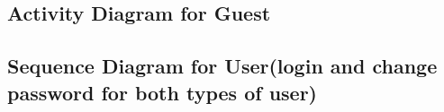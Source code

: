 \subsection{Activity Diagram for Guest}
\begin{figure}[H]
 \label{4}
 \end{figure}

\subsection{Sequence Diagram for User(login and change password for both types of user)}
\begin{figure}[H]
 \label{10}
 \end{figure}

